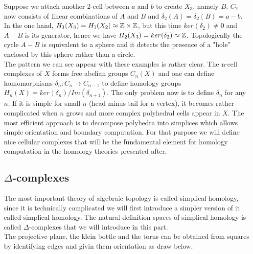 \documentclass[12pt]{article}
\begin{document}
Suppose we attach another 2-cell between $a$ and $b$ to create $X_3$, namely $B$. $C_2$ now consists of linear combinations of $A$ and $B$ and $\delta_2(A) = \delta_2(B) = a-b$. In the one hand, $H_1(X_3) = H_1(X_2) \approx \mathbb{Z} \times \mathbb{Z}$, but this time $ker(\delta_2) \neq 0$ and $A-B$ is its generator, hence we have $H_2(X_3) = ker(\delta_2) \approx \mathbb{Z}$. Topologically the cycle $A-B$ is equivalent to a sphere and it detects the presence of a "hole" enclosed by this sphere rather than a circle.\\

The pattern we can see appear with these examples is rather clear. The n-cell complexes of $X$ forms free abelian groups $C_n(X)$ and one can define homomorphisms $\delta_n: C_n \to C_{n-1}$ to define homology groups $H_n(X) = ker(\delta_n)/Im(\delta_{n+1})$. The only problem now is to define $\delta_n$ for any $n$. If it is simple for small $n$ (head minus tail for a vertex), it becomes rather complicated when $n$ grows and more complex polyhedral cells appear in $X$. The most efficient approach is to decompose polyhedra into simplices which allows simple orientation and boundary computation. For that purpose we will define nice cellular complexes that will be the fundamental element for homology computation in the homology theories presented after. 

\subsection{$\Delta$-complexes}

The most important theory of algebraic topology is called simplical homology, since it is technically complicated we will first introduce a simpler version of it called simplical homology. The natural definition spaces of simplical homology is called $\Delta$-complexes that we will introduce in this part.\\

The projective plane, the klein bottle and the torus can be obtained from squares by identifying edges and givin them orientation as draw below.
\end{document}
